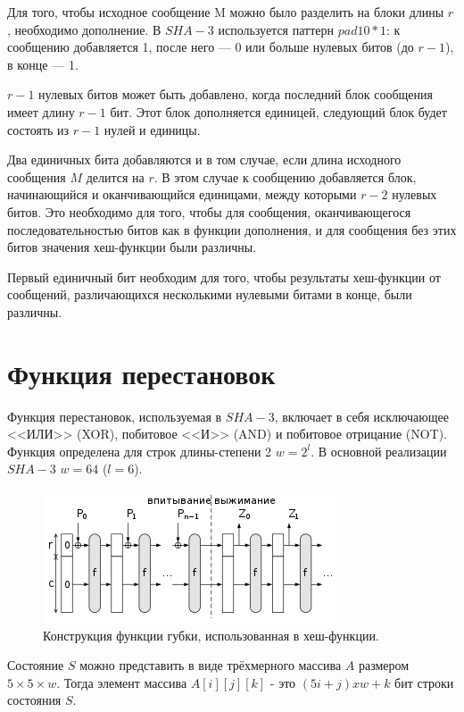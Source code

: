 \documentclass{book}
\begin{document}
Для того, чтобы исходное сообщение M можно было разделить на блоки длины $r$, необходимо дополнение. В $SHA-3$ используется паттерн $pad10*1$: к сообщению добавляется 1, после него --- 0 или больше нулевых битов (до $r-1$), в конце --- 1.

$r-1$ нулевых битов может быть добавлено, когда последний блок сообщения имеет длину $r-1$ бит. Этот блок дополняется единицей, следующий блок будет состоять из $r-1$ нулей и единицы.



Два единичных бита добавляются и в том случае, если длина исходного сообщения $M$ делится на $r$. В этом случае к сообщению добавляется блок, начинающийся и оканчивающийся единицами, между которыми $r-2$ нулевых битов. Это необходимо для того, чтобы для сообщения, оканчивающегося последовательностью битов как в функции дополнения, и для сообщения без этих битов значения хеш-функции были различны.





Первый единичный бит необходим для того, чтобы результаты хеш-функции от сообщений, различающихся несколькими нулевыми битами в конце, были различны.



\section*{Функция перестановок}

Функция перестановок, используемая в $SHA-3$, включает в себя исключающее <<ИЛИ>> (XOR), побитовое <<И>> (AND) и побитовое отрицание (NOT). Функция определена для строк длины-степени 2 $w=2^{l}$. В основной реализации $SHA-3$ $w=64$ ($l=6$).

 \begin{figure}[h]
    \centering
    \includegraphics[scale=0.5]{pics/langru-330px-SpongeConstruction.svg (1).png}
     \caption{Конструкция функции губки, использованная в хеш-функции.}
\end{figure}

Состояние $S$ можно представить в виде трёхмерного массива $A$ размером $5 × 5 × w$. Тогда элемент массива $A[i][j][k]$ - это $(5i+j) x w+k$ бит строки состояния $S$.
\end{document}
